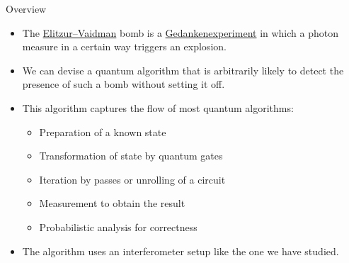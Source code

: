 
\begin{frame}{Overview}

\begin{itemize}
    \item The \href{https://en.wikipedia.org/wiki/Elitzur-Vaidman_bomb_tester}{Elitzur--Vaidman} bomb is a \href{https://en.wikipedia.org/wiki/Thought_experiment}{Gedankenexperiment} in which a photon measure in a certain way triggers an explosion.
    \item We can devise a quantum algorithm that is arbitrarily likely to detect the presence of such a bomb without setting it off.
    \item This algorithm captures the flow of most quantum algorithms:
    \begin{itemize}
        \item Preparation of a known state
        \item Transformation of state by quantum gates
        \item Iteration by passes or unrolling of a circuit
        \item Measurement to obtain the result
        \item Probabilistic analysis for correctness
    \end{itemize}
    \item The algorithm uses an interferometer setup like the one we have studied.
\end{itemize}
    
\end{frame}